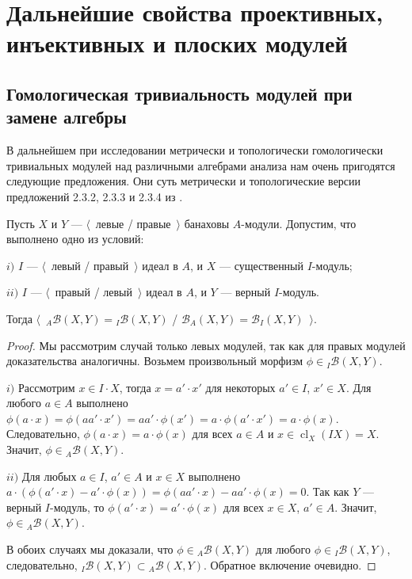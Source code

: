 \section{Дальнейшие свойства проективных, инъективных и плоских модулей}
\label{SectionFurtherPropertiesOfProjectiveInjectiveAndFlatModules}


\subsection{Гомологическая тривиальность модулей при замене алгебры}
\label{SubSectionHomologicalTrivialityOfModulesUnderChangeOfAlgebra}

В дальнейшем при исследовании метрически и топологически гомологически тривиальных модулей над различными алгебрами анализа нам очень пригодятся следующие предложения. Они суть метрически и топологические версии предложений 2.3.2, 2.3.3 и 2.3.4 из \cite{RamsHomPropSemgroupAlg}.

\begin{proposition}\label{MorphCoincide} Пусть $X$ и $Y$ --- $\langle$~левые / правые~$\rangle$ банаховы $A$-модули. Допустим, что выполнено одно из условий:

$i)$ $I$ --- $\langle$~левый / правый~$\rangle$ идеал в $A$, и $X$ --- существенный $I$-модуль;

$ii)$ $I$ --- $\langle$~правый / левый~$\rangle$ идеал в $A$, и $Y$ --- верный $I$-модуль.

Тогда $\langle$~${}_A\mathcal{B}(X,Y)={}_I\mathcal{B}(X,Y)$ / $\mathcal{B}_A(X,Y)=\mathcal{B}_I(X,Y)$~$\rangle$.
\end{proposition}
\begin{proof} Мы рассмотрим случай только левых модулей, так как для правых модулей доказательства аналогичны. Возьмем произвольный морфизм $\phi\in {}_I\mathcal{B}(X,Y)$.

$i)$ Рассмотрим $x\in I\cdot X$, тогда $x=a'\cdot x'$ для некоторых $a'\in I$, $x'\in X$. Для любого $a\in A$ выполнено $\phi(a\cdot x)=\phi(aa'\cdot x')=aa'\cdot\phi(x')=a\cdot\phi(a'\cdot x')=a\cdot\phi(x)$. Следовательно, $\phi(a\cdot x)=a\cdot\phi(x)$ для всех $a\in A$ и $x\in \operatorname{cl}_X(IX)=X$. Значит, $\phi\in {}_A\mathcal{B}(X,Y)$.

$ii)$ Для любых $a\in I$, $a'\in A$ и $x\in X$ выполнено $a\cdot(\phi(a'\cdot x)-a'\cdot\phi(x))=\phi(aa'\cdot x)-aa'\cdot\phi(x)=0$. Так как $Y$ --- верный $I$-модуль, то $\phi(a'\cdot x)=a'\cdot \phi(x)$ для всех $x\in X$, $a'\in A$. Значит, $\phi\in{}_A\mathcal{B}(X,Y)$.

В обоих случаях мы доказали, что $\phi\in{}_A\mathcal{B}(X,Y)$ для любого $\phi\in{}_I\mathcal{B}(X,Y)$, следовательно, ${}_I\mathcal{B}(X,Y)\subset {}_A\mathcal{B}(X,Y)$. Обратное включение очевидно.
\end{proof}

